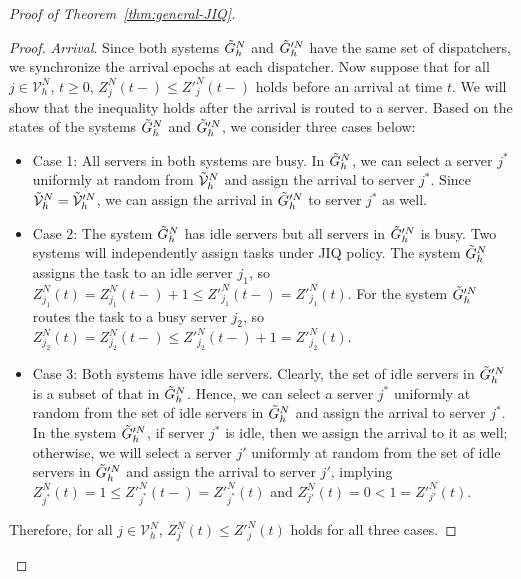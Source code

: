\documentclass[11pt, reqno]{article}
\numberwithin{equation}{section}
\numberwithin{theorem}{section}
\let\plainqed\qedsymbol
\newcommand{\claimqed}{$\lrcorner$}
\newenvironment{claimproof}{\begin{proof}\renewcommand{\qedsymbol}{\claimqed}}{\end{proof}\renewcommand{\qedsymbol}{\plainqed}}
\newcommand{\N}{\mathbb{N}}                 %
\begin{document}
\begin{proof}[Proof of Theorem~\ref{thm:general-JIQ}]
\begin{claimproof}
\noindent
\textit{Arrival}. Since both systems $\Tilde{G}^N_h$ and $\Tilde{G}'^N_h$ have the same set of dispatchers, 
we synchronize the arrival epochs at each dispatcher. 
Now suppose that for all $j\in\mathcal{V}^N_h$, $t\geq 0$,  $Z^N_j(t-)\leq Z'^N_j(t-)$ holds before an arrival at time $t$. 
We will show that the inequality holds after the arrival is routed to a server. 
Based on the states of the systems $\Tilde{G}^N_h$ and $\Tilde{G}'^N_h$, we consider three cases below:
\begin{itemize}
    \item Case 1: All servers in both systems are busy. In $\Tilde{G}^N_h$, we can select a server $j^{*}$ uniformly at random from $\Tilde{\mathcal{V}}^N_h$ and assign the arrival to server $j^{*}$. Since $\Tilde{\mathcal{V}}^N_h=\Tilde{\mathcal{V}}'^N_h$, we can assign the arrival in $\Tilde{G}'^N_h$ to server $j^{*}$ as well.
    \item Case 2: The system $\Tilde{G}^N_h$ has idle servers but all servers in $\Tilde{G}'^N_h$ is busy. Two systems will independently assign tasks under JIQ policy. 
    The system $\Tilde{G}^N_h$ assigns the task to an idle server $j_1$, so $Z^N_{j_1}(t)=Z^N_{j_1}(t-)+1\leq Z'^N_{j_1}(t-)=Z'^N_{j_1}(t)$. For the system $\Tilde{G}'^N_h$ routes the task to a busy server $j_2$, so $Z^N_{j_2}(t)=Z^N_{j_2}(t-)\leq Z'^N_{j_2}(t-)+1=Z'^N_{j_2}(t)$.
    \item Case 3: Both systems have idle servers. Clearly, the set of idle servers in $\Tilde{G}'^N_h$ is a subset of that in $\Tilde{G}^N_h$. Hence, we can select a server $j^*$ uniformly at random from the set of idle servers in $\Tilde{G}^N_h$ and assign the arrival to server $j^*$. In the system $\Tilde{G}'^N_h$, if server $j^*$ is idle, then we assign the arrival to it as well; otherwise, we will select a server $j'$ uniformly at random from the set of idle servers in $\Tilde{G}'^N_h$ and assign the arrival to server $j'$, implying $Z^N_{j^*}(t)=1\leq Z'^N_{j^*}(t-)=Z'^N_{j^*}(t)$ and $Z^N_{j'}(t)=0<1=Z'^N_{j'}(t)$.
\end{itemize}
Therefore, for all $j\in\mathcal{V}^N_h$,  $Z^N_j(t)\leq Z'^N_j(t)$ holds for all three cases.
\vspace{.2cm}




\end{claimproof}
\end{proof}
\end{document}
